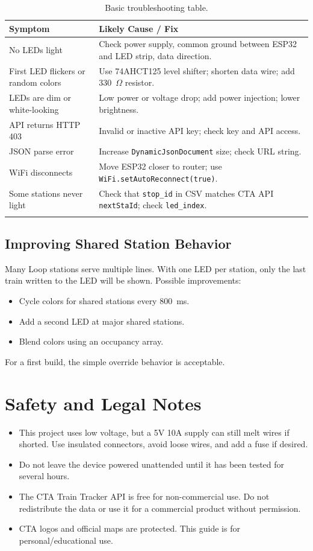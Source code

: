 \documentclass[11pt]{article}
\begin{document}
\begin{longtable}{p{4.5cm} p{8.5cm}}
\toprule
\textbf{Symptom} & \textbf{Likely Cause / Fix} \\
\midrule
No LEDs light & Check power supply, common ground between ESP32 and LED strip, data direction. \\
First LED flickers or random colors & Use 74AHCT125 level shifter; shorten data wire; add 330~$\Omega$ resistor. \\
LEDs are dim or white-looking & Low power or voltage drop; add power injection; lower brightness. \\
API returns HTTP 403 & Invalid or inactive API key; check key and API access. \\
JSON parse error & Increase \texttt{DynamicJsonDocument} size; check URL string. \\
WiFi disconnects & Move ESP32 closer to router; use \texttt{WiFi.setAutoReconnect(true)}. \\
Some stations never light & Check that \texttt{stop\_id} in CSV matches CTA API \texttt{nextStaId}; check \texttt{led\_index}. \\
\bottomrule
\caption{Basic troubleshooting table.}
\label{tab:troubleshoot}
\end{longtable}

\subsection{Improving Shared Station Behavior}

Many Loop stations serve multiple lines. With one LED per station, only the last train written to the LED will be shown. Possible improvements:

\begin{itemize}
    \item Cycle colors for shared stations every 800~ms.
    \item Add a second LED at major shared stations.
    \item Blend colors using an occupancy array.
\end{itemize}

For a first build, the simple override behavior is acceptable.

\section{Safety and Legal Notes}

\begin{itemize}
    \item This project uses low voltage, but a 5V 10A supply can still melt wires if shorted. Use insulated connectors, avoid loose wires, and add a fuse if desired.
    \item Do not leave the device powered unattended until it has been tested for several hours.
    \item The CTA Train Tracker API is free for non-commercial use. Do not redistribute the data or use it for a commercial product without permission.
    \item CTA logos and official maps are protected. This guide is for personal/educational use.
\end{itemize}
\end{document}
